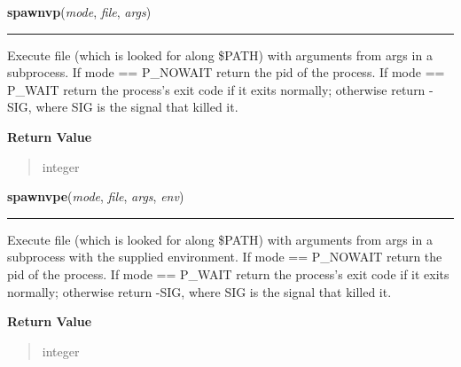     \label{os:spawnvp}

    \vspace{0.5ex}

\hspace{.8\funcindent}\begin{boxedminipage}{\funcwidth}

    \raggedright \textbf{spawnvp}(\textit{mode}, \textit{file}, \textit{args})

    \vspace{-1.5ex}

    \rule{\textwidth}{0.5\fboxrule}
\setlength{\parskip}{2ex}
    Execute file (which is looked for along \$PATH) with arguments from 
    args in a subprocess. If mode == P\_NOWAIT return the pid of the 
    process. If mode == P\_WAIT return the process's exit code if it exits 
    normally; otherwise return -SIG, where SIG is the signal that killed 
    it.

\setlength{\parskip}{1ex}
      \textbf{Return Value}
    \vspace{-1ex}

      \begin{quote}
      integer

      \end{quote}

    \end{boxedminipage}

    \label{os:spawnvpe}

    \vspace{0.5ex}

\hspace{.8\funcindent}\begin{boxedminipage}{\funcwidth}

    \raggedright \textbf{spawnvpe}(\textit{mode}, \textit{file}, \textit{args}, \textit{env})

    \vspace{-1.5ex}

    \rule{\textwidth}{0.5\fboxrule}
\setlength{\parskip}{2ex}
    Execute file (which is looked for along \$PATH) with arguments from 
    args in a subprocess with the supplied environment. If mode == 
    P\_NOWAIT return the pid of the process. If mode == P\_WAIT return the 
    process's exit code if it exits normally; otherwise return -SIG, where 
    SIG is the signal that killed it.

\setlength{\parskip}{1ex}
      \textbf{Return Value}
    \vspace{-1ex}

      \begin{quote}
      integer

      \end{quote}

    \end{boxedminipage}

